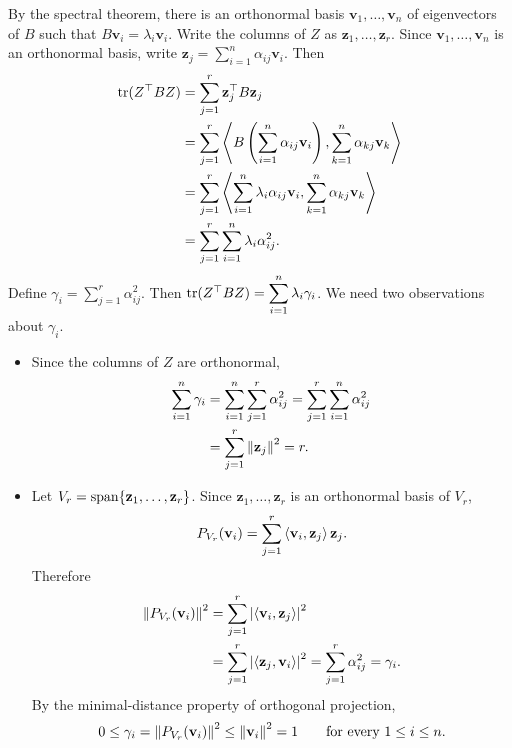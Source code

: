 \begin{pfbox}
By the spectral theorem, there is an orthonormal basis $\mathbf{v}_1,\ldots,\mathbf{v}_n$ of eigenvectors of $B$ such that
$B\mathbf{v}_i=\lambda_i\mathbf{v}_i$. Write the columns of $Z$ as
$\mathbf{z}_1,\ldots,\mathbf{z}_r$. Since
$\mathbf{v}_1,\ldots,\mathbf{v}_n$ is an orthonormal basis, write
$\mathbf{z}_j=\displaystyle\sum_{i=1}^n\alpha_{ij}\mathbf{v}_i$. Then
\[
\begin{aligned}
    \operatorname{tr}(Z^{\top}BZ)
    &=
    \sum_{j=1}^r \mathbf{z}_j^{\top}B\mathbf{z}_j\\
    &=
    \sum_{j=1}^r
    \left\langle
        B\left(\sum_{i=1}^n\alpha_{ij}\mathbf{v}_i\right),
        \sum_{k=1}^n\alpha_{kj}\mathbf{v}_k
    \right\rangle\\
    &=
    \sum_{j=1}^r
    \left\langle
        \sum_{i=1}^n\lambda_i\alpha_{ij}\mathbf{v}_i,
        \sum_{k=1}^n\alpha_{kj}\mathbf{v}_k
    \right\rangle\\
    &=
    \sum_{j=1}^r\sum_{i=1}^n\lambda_i\alpha_{ij}^2.
\end{aligned}
\]
Define $\gamma_i=\displaystyle\sum_{j=1}^r\alpha_{ij}^2$. Then
$\operatorname{tr}(Z^{\top}BZ)=\displaystyle\sum_{i=1}^n\lambda_i\gamma_i$.
We need two observations about $\gamma_i$.
\begin{itemize}
    \item Since the columns of $Z$ are orthonormal,
    \[
    \begin{aligned}
        \sum_{i=1}^n\gamma_i
        &=
        \sum_{i=1}^n\sum_{j=1}^r\alpha_{ij}^2
        =
        \sum_{j=1}^r\sum_{i=1}^n\alpha_{ij}^2\\
        &=
        \sum_{j=1}^r\left\lVert \mathbf{z}_j \right\rVert^2
        =
        r.
    \end{aligned}
    \]

    \item Let
    $V_r=\operatorname{span}\{\mathbf{z}_1,\ldots,\mathbf{z}_r\}$. Since
    $\mathbf{z}_1,\ldots,\mathbf{z}_r$ is an orthonormal basis of $V_r$,
    \[
        P_{V_r}(\mathbf{v}_i)
        =
        \sum_{j=1}^r
        \left\langle \mathbf{v}_i, \mathbf{z}_j \right\rangle\mathbf{z}_j.
    \]
    Therefore
    \[
    \begin{aligned}
        \left\lVert P_{V_r}(\mathbf{v}_i) \right\rVert^2
        &=
        \sum_{j=1}^r
        \left|
            \left\langle \mathbf{v}_i, \mathbf{z}_j \right\rangle
        \right|^2\\
        &=
        \sum_{j=1}^r
        \left|
            \left\langle \mathbf{z}_j, \mathbf{v}_i \right\rangle
        \right|^2
        =
        \sum_{j=1}^r\alpha_{ij}^2
        =
        \gamma_i.
    \end{aligned}
    \]
    By the minimal-distance property of orthogonal projection,
    \[
        0
        \le
        \gamma_i
        =
        \left\lVert P_{V_r}(\mathbf{v}_i) \right\rVert^2
        \le
        \left\lVert \mathbf{v}_i \right\rVert^2
        =
        1
        \qquad
        \text{for every }1\le i\le n.
    \]
\end{itemize}


\end{pfbox}
